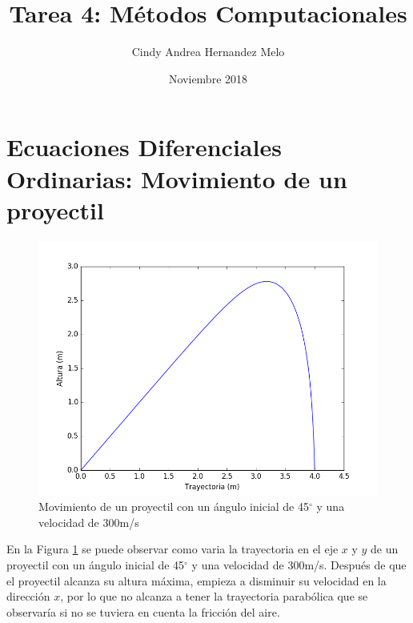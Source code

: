 \documentclass[]{article}
\title{Tarea 4: Métodos Computacionales}
\author{Cindy Andrea Hernandez Melo }
\date{Noviembre 2018}
\begin{document}
\maketitle

\section{Ecuaciones Diferenciales Ordinarias: Movimiento de un proyectil}
\begin{figure}[H]
    \centering
    \includegraphics[width = \linewidth]{proyectil45.png}
    \caption{Movimiento de un proyectil con un ángulo inicial de 45$^\circ$ y una velocidad de 300m/s }
    \label{fig:proyectil45}
\end{figure}
En la Figura \ref{fig:proyectil45} se puede observar como varia la trayectoria en el eje $x$ y $y$ de un proyectil con un ángulo inicial de 45$^\circ$ y una velocidad de 300m/s. Después de que el proyectil alcanza su altura máxima, empieza a disminuir su velocidad en la dirección $x$, por lo que no alcanza a tener la trayectoria parabólica que se observaría si no se tuviera en cuenta la fricción del aire.
\end{document}
